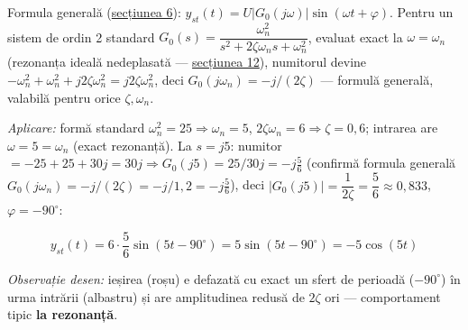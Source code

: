 \documentclass[10pt,a4paper]{article}
\newcommand{\tip}[1]{\textcolor{blue!55!black}{#1}}
\begin{document}
Formula generală (\hyperref[sec:6]{secțiunea 6}): $y_{st}(t)=U|G_0(j\omega)|\sin(\omega t+\varphi)$. Pentru un sistem de ordin 2 standard $G_0(s)=\dfrac{\omega_n^2}{s^2+2\zeta\omega_ns+\omega_n^2}$, evaluat exact la $\omega{=}\omega_n$ (rezonanța ideală nedeplasată — \hyperref[sec:12]{secțiunea 12}), numitorul devine $-\omega_n^2+\omega_n^2+j2\zeta\omega_n^2=j2\zeta\omega_n^2$, deci $G_0(j\omega_n)={-}j/(2\zeta)$ — formulă generală, valabilă pentru orice $\zeta,\omega_n$.

\textit{Aplicare:} formă standard $\omega_n^2{=}25\Rightarrow\omega_n{=}5$, $2\zeta\omega_n{=}6\Rightarrow\zeta{=}0{,}6$; intrarea are $\omega{=}5{=}\omega_n$ (exact rezonanță). La $s{=}j5$: numitor $={-}25{+}25{+}30j{=}30j\Rightarrow G_0(j5){=}25/30j{=}{-}j\tfrac56$ (confirmă formula generală $G_0(j\omega_n){=}{-}j/(2\zeta){=}{-}j/1{,}2={-}j\tfrac56$), deci $|G_0(j5)|=\dfrac1{2\zeta}=\dfrac56\approx0{,}833$, $\varphi=-90^\circ$:
\begin{keyeq}\color{red!65!black}
$$y_{st}(t)=6\cdot\dfrac56\sin(5t-90^\circ)=5\sin(5t-90^\circ)=-5\cos(5t)$$
\end{keyeq}

\begin{center}
\end{center}
\tip{\textit{Observație desen:} ieșirea (roșu) e defazată cu exact un sfert de perioadă ($-90^\circ$) în urma intrării (albastru) și are amplitudinea redusă de $2\zeta$ ori — comportament tipic \textbf{la rezonanță}.}
\end{document}
